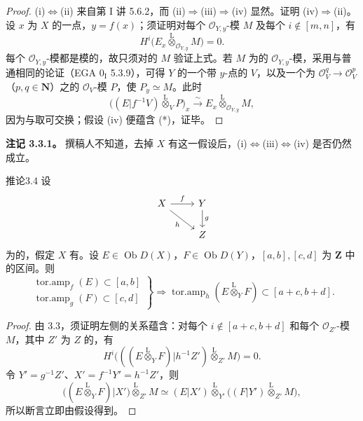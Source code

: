 \begin{proof}
(i)$\Longleftrightarrow$(ii) 来自第 I 讲 5.6.2，而 (ii)$\Longrightarrow$(iii)$\Longrightarrow$(iv) 显然。证明 (iv)$\Longrightarrow$(ii)。设 $x$ 为 $X$ 的一点，$y=f(x)$；须证明对每个 $\mathcal O_{Y,y}$-模 $M$ 及每个 $i\notin[m,n]$，有
\[H^i\bigl(E_x\mathbin{\overset{\mathrm L}{\otimes}}_{\mathcal O_{Y,y}}M\bigr)=0.\tag{*}\]
每个 $\mathcal O_{Y,y}$-模都是模的，故只须对的 $M$ 验证上式。若 $M$ 为的 $\mathcal O_{Y,y}$-模，采用与普通相同的论证（EGA $0_{\mathrm I}$ 5.3.9），可得 $Y$ 的一个带 $y$-点的 $V$，以及一个为 $\mathcal O_V^q\to\mathcal O_V^p$（$p,q\in\mathbf N$）之的 $\mathcal O_V$-模 $P$，使 $P_y\simeq M$。此时
\[\bigl((E|f^{-1}V)\mathbin{\overset{\mathrm L}{\otimes}}_VP\bigr)_x\xrightarrow{\sim}E_x\mathbin{\overset{\mathrm L}{\otimes}}_{\mathcal O_{Y,y}}M,\]
因为与取可交换；假设 (iv) 便蕴含 (*)，证毕。
\end{proof}
\textbf{注记 3.3.1。} 撰稿人不知道，去掉 $X$ 有这一假设后，(i)$\Longleftrightarrow$(iii)$\Longleftrightarrow$(iv) 是否仍然成立。
\begin{SGAresult}{推论}{3.4}
设
\[
\begin{tikzcd}X\arrow[r,"f"]\arrow[dr,"h"']&Y\arrow[d,"g"]\\&Z\end{tikzcd}
\]
为的，假定 $X$ 有。设 $E\in\operatorname{Ob}D(X)$，$F\in\operatorname{Ob}D(Y)$，$[a,b],[c,d]$ 为 $\mathbf Z$ 中的区间。则
\[\left.\begin{gathered}\operatorname{tor.amp}_f(E)\subset[a,b]\\\operatorname{tor.amp}_g(F)\subset[c,d]\end{gathered}\right\}
\Longrightarrow\operatorname{tor.amp}_h(E\mathbin{\overset{\mathrm L}{\otimes}}_YF)\subset[a+c,b+d].\]
\end{SGAresult}
\begin{proof}
由 3.3，须证明左侧的关系蕴含：对每个 $i\notin[a+c,b+d]$ 和每个 $\mathcal O_{Z'}$-模 $M$，其中 $Z'$ 为 $Z$ 的，有
\[H^i\bigl(((E\mathbin{\overset{\mathrm L}{\otimes}}_YF)|h^{-1}Z')\mathbin{\overset{\mathrm L}{\otimes}}_{Z'}M\bigr)=0.\]
令 $Y'=g^{-1}Z'$、$X'=f^{-1}Y'=h^{-1}Z'$，则
\[\bigl((E\mathbin{\overset{\mathrm L}{\otimes}}_YF)|X'\bigr)\mathbin{\overset{\mathrm L}{\otimes}}_{Z'}M
\simeq(E|X')\mathbin{\overset{\mathrm L}{\otimes}}_{Y'}\bigl((F|Y')\mathbin{\overset{\mathrm L}{\otimes}}_{Z'}M\bigr),\]
所以断言立即由假设得到。
\end{proof}

